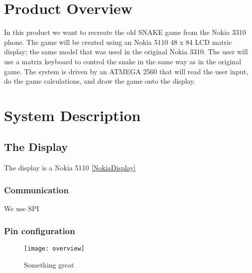 \section{Product Overview}
In this product we want to recreate the old SNAKE game from the Nokia 3310 phone. The game will be created using an Nokia 5110 48 x 84 LCD matric display; the same model that was used in the original Nokia 3310. The user will use a matrix keyboard to control the snake in the same way as in the original game. The system is driven by an ATMEGA 2560 that will read the user input, do the game calculations, and draw the game onto the display.

\section{System Description}
\subsection{The Display}
The display is a Nokia 5110 \ref{NokiaDisplay}
\subsubsection{Communication}
We use SPI
\subsubsection{Pin configuration}


\begin{figure}[H]
	\texttt{[image: overview]}
	\caption{Something great}
	\label{overview}
\end{figure}